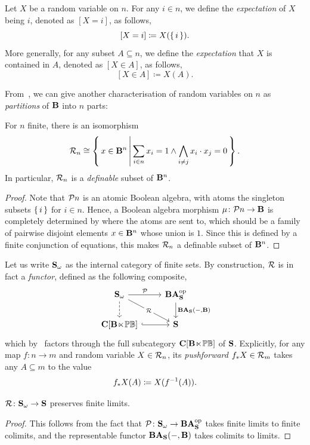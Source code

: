 \begin{remark}\label{rem:expectation}
  Let $X$ be a random variable on $n$. For any $i \in n$, we define the \emph{expectation} of $X$ being $i$, denoted as $[X = i]$, as follows,
  \[ [X = i] \coloneq X(\{\,i\,\}). \]
  More generally, for any subset $A \subseteq n$, we define the \emph{expectation} that $X$ is contained in $A$, denoted as $[X \in A]$, as follows,
  \[ [X \in A] \coloneq X(A). \]
\end{remark}

From~, we can give another characterisation of random variables on $n$ as \emph{partitions} of $\mathbf{B}$ into $n$ parts:

\begin{proposition}\label{prop:randomvariablesaspartition}
  For $n$ finite, there is an isomorphism 
  \[ \mathcal{R}_n \cong \left\{\,x \in \mathbf{B}^n\,\middle|\,\sum_{i\in n}x_i = 1 \wedge \bigwedge_{i \neq j} x_i \cdot x_j = 0\,\right\}. \]
  In particular, $\mathcal{R}_n$ is a \emph{definable} subset of $\mathbf{B}^n$.
\end{proposition}
\begin{proof}
  Note that $\mathcal{P}n$ is an atomic Boolean algebra, with atoms the singleton subsets $\{\,i\,\}$ for $i\in n$. Hence, a Boolean algebra morphism $\mu \colon \mathcal{P}n \to \mathbf{B}$ is completely determined by where the atoms are sent to, which should be a family of pairwise disjoint elements $x \in \mathbf{B}^n$ whose union is $1$. Since this is defined by a finite conjunction of equations, this makes $\mathcal{R}_n$ a definable subset of $\mathbf{B}^n$.
\end{proof}

Let us write $\mathbf{S}_\omega$ as the internal category of finite sets. By construction, $\mathcal{R}$ is in fact a \emph{functor}, defined as the following composite,
\[ 
\begin{tikzcd}
  \mb S_\omega \ar[dr, "\mc R"{description}] \ar[d, dashed] \ar[r, "\mc P"] & \BA_{\mb S}\op \ar[d, "{\BA_{\mb S}(-,\mb B)}"] \\ 
  {\mb C[\BPB]} \ar[r, hook] & \mb S
\end{tikzcd}
\]
which by~ factors through the full subcategory $\mathbf{C}[\mathbf{B}\hspace{-.4ex}\ltimes\hspace{-.4ex}\mathbb{PB}]$ of $\mathbf{S}$. Explicitly, for any map $f \colon n \to m$ and random variable $X\in\mathcal{R}_n$, its \emph{pushforward} $f_*X\in\mathcal{R}_m$ takes any $A\subseteq m$ to the value
\[ f_*X(A) \coloneq X(f^{\mathrm{-1}}(A)). \]

\begin{corollary}\label{cor:randomfinitelimits}
  $\mathcal{R} \colon \mathbf{S}_\omega \to \mathbf{S}$ preserves finite limits.
\end{corollary}
\begin{proof}
  This follows from the fact that $\mathcal{P} \colon \mathbf{S}_\omega \to \mathbf{BA}_{\mathbf{S}}^{\mathrm{op}}$ takes finite limits to finite colimits, and the representable functor $\mathbf{BA}_{\mathbf{S}}(-,\mathbf{B})$ takes colimits to limits.
\end{proof}

